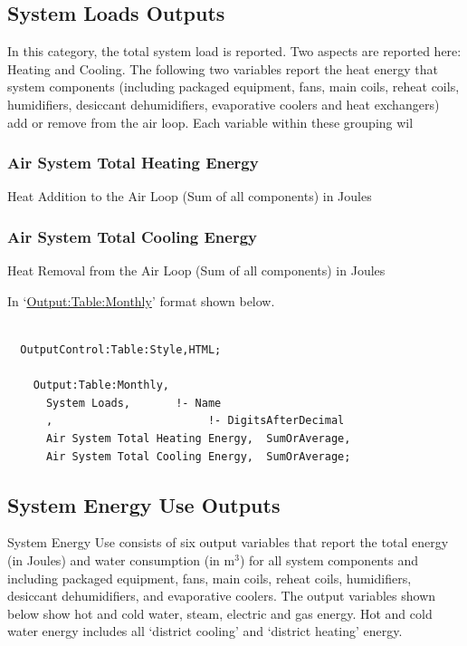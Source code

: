 \subsection{System Loads Outputs}\label{system-loads-outputs}

In this category, the total system load is reported. Two aspects are reported here: Heating and Cooling. The following two variables report the heat energy that system components (including packaged equipment, fans, main coils, reheat coils, humidifiers, desiccant dehumidifiers, evaporative coolers and heat exchangers) add or remove from the air loop. Each variable within these grouping wil

\subsubsection{Air System Total Heating Energy}\label{air-system-total-heating-energy}

Heat Addition to the Air Loop (Sum of all components) in Joules

\subsubsection{Air System Total Cooling Energy}\label{air-system-total-cooling-energy}

Heat Removal from the Air Loop (Sum of all components) in Joules

In `\hyperref[outputtablemonthly]{Output:Table:Monthly}' format shown below.

\begin{lstlisting}

  OutputControl:Table:Style,HTML;

    Output:Table:Monthly,
      System Loads,       !- Name
      ,                        !- DigitsAfterDecimal
      Air System Total Heating Energy,  SumOrAverage,
      Air System Total Cooling Energy,  SumOrAverage;
\end{lstlisting}

\subsection{System Energy Use Outputs}\label{system-energy-use-outputs}

System Energy Use consists of six output variables that report the total energy (in Joules) and water consumption (in m\(^{3}\)) for all system components and including packaged equipment, fans, main coils, reheat coils, humidifiers, desiccant dehumidifiers, and evaporative coolers. The output variables shown below show hot and cold water, steam, electric and gas energy. Hot and cold water energy includes all `district cooling' and `district heating' energy.

